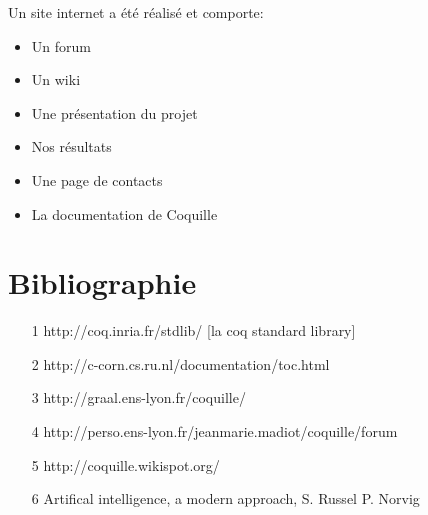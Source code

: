 \documentclass[slidetop]{beamer}
\begin{document}
\begin{frame}
Un site internet a été réalisé et comporte:
\begin{itemize}
    \item Un forum 
    \item Un wiki
    \item Une présentation du projet 
    \item Nos résultats
    \item Une page de contacts
    \item La documentation de Coquille %
\end{itemize}


\end{frame}



\section{Bibliographie}
\begin{frame}
 \begin{itemize}
\item [1] http://coq.inria.fr/stdlib/ [la coq standard library]
\item [2] http://c-corn.cs.ru.nl/documentation/toc.html%
\item [3] http://graal.ens-lyon.fr/coquille/
\item [4] http://perso.ens-lyon.fr/jeanmarie.madiot/coquille/forum %
\item [5] http://coquille.wikispot.org/ %
\item [6] Artifical intelligence, a modern approach, S. Russel P. Norvig

\end{itemize}
\end{frame}


 
\end{document}
